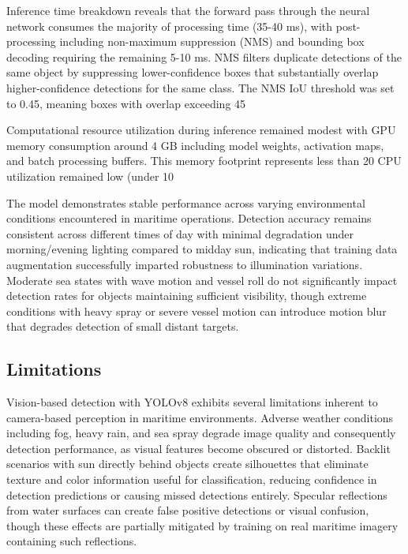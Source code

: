 \documentclass{erauthesis}
\begin{document}
Inference time breakdown reveals that the forward pass through the neural network consumes the majority of processing time (35-40 ms), with post-processing including non-maximum suppression (NMS) and bounding box decoding requiring the remaining 5-10 ms.
NMS filters duplicate detections of the same object by suppressing lower-confidence boxes that substantially overlap higher-confidence detections for the same class.
The NMS IoU threshold was set to 0.45, meaning boxes with overlap exceeding 45%

Computational resource utilization during inference remained modest with GPU memory consumption around 4 GB including model weights, activation maps, and batch processing buffers.
This memory footprint represents less than 20%
CPU utilization remained low (under 10%

The model demonstrates stable performance across varying environmental conditions encountered in maritime operations.
Detection accuracy remains consistent across different times of day with minimal degradation under morning/evening lighting compared to midday sun, indicating that training data augmentation successfully imparted robustness to illumination variations.
Moderate sea states with wave motion and vessel roll do not significantly impact detection rates for objects maintaining sufficient visibility, though extreme conditions with heavy spray or severe vessel motion can introduce motion blur that degrades detection of small distant targets.

\subsection{Limitations} \label{sec:yolo_limitations}

Vision-based detection with YOLOv8 exhibits several limitations inherent to camera-based perception in maritime environments.
Adverse weather conditions including fog, heavy rain, and sea spray degrade image quality and consequently detection performance, as visual features become obscured or distorted.
Backlit scenarios with sun directly behind objects create silhouettes that eliminate texture and color information useful for classification, reducing confidence in detection predictions or causing missed detections entirely.
Specular reflections from water surfaces can create false positive detections or visual confusion, though these effects are partially mitigated by training on real maritime imagery containing such reflections.
\end{document}
